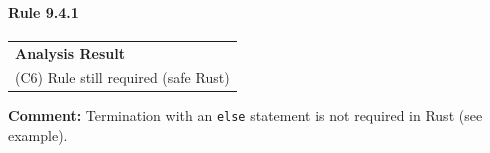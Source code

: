 \paragraph{Rule 9.4.1}
\begin{longtable}{p{13cm}}
\textbf{Analysis Result} \\
(C6) Rule still required (safe Rust) \\
\end{longtable}
\textbf{Comment:} Termination with an \texttt{else} statement is not required in Rust (see example). \\


